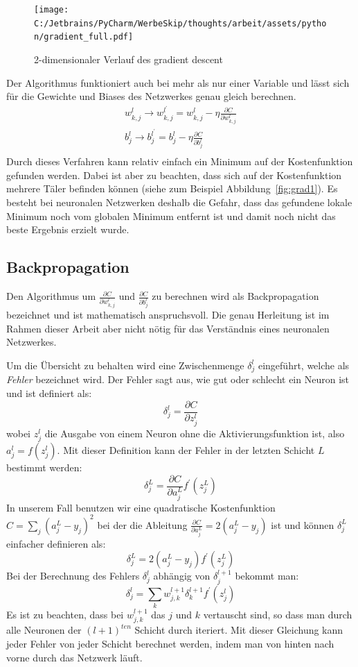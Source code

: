 \documentclass[12pt,a4paper]{report}
\begin{document}
\begin{figure}[!h]%
    \centering
    \texttt{[image: C:/Jetbrains/PyCharm/WerbeSkip/thoughts/arbeit/assets/python/gradient\_full.pdf]} %
    \caption{2-dimensionaler Verlauf des gradient descent}%
    \label{fig:grad2}%
\end{figure}

Der Algorithmus funktioniert auch bei mehr als nur einer Variable und lässt sich für die Gewichte und Biases des Netzwerkes genau gleich berechnen.
\begin{gather*}
    w^l_{k,j} \rightarrow w^{l^\prime}_{k,j} = w^l_{k,j} - \eta\frac{\partial C}{\partial w^l_{k,j}}\\
    b^l_j \rightarrow b^{l^\prime}_j = b^l_j - \eta\frac{\partial C}{\partial b^l_j}\\
\end{gather*}
Durch dieses Verfahren kann relativ einfach ein Minimum auf der Kostenfunktion gefunden werden.
Dabei ist aber zu beachten, dass sich auf der Kostenfunktion mehrere Täler befinden können (siehe zum Beispiel Abbildung~\ref{fig:grad1}).
Es besteht bei neuronalen Netzwerken deshalb die Gefahr, dass das gefundene lokale Minimum noch vom globalen Minimum entfernt ist und
damit noch nicht das beste Ergebnis erzielt wurde.

\subsection{Backpropagation}
Den Algorithmus um $\frac{\partial C}{\partial w^l_{k,j}}$ und $\frac{\partial C}{\partial b^l_j}$ zu berechnen wird als
Backpropagation bezeichnet und ist mathematisch anspruchsvoll.
Die genau Herleitung ist im Rahmen dieser Arbeit aber nicht nötig für das Verständnis eines neuronalen Netzwerkes.

Um die Übersicht zu behalten wird eine Zwischenmenge $\delta^l_j$ eingeführt, welche als \textit{Fehler} bezeichnet wird.
Der Fehler sagt aus, wie gut oder schlecht ein Neuron ist und ist definiert als:
\[\delta^l_j = \frac{\partial C}{\partial z^l_j}\]
wobei $z^l_j$ die Ausgabe von einem Neuron ohne die Aktivierungsfunktion ist, also $a^l_j = f(z^l_j)$.
Mit dieser Definition kann der Fehler in der letzten Schicht $L$ bestimmt werden:
\[\delta^L_j = \frac{\partial C}{\partial a^L_j}f^\prime(z^L_j)\]
In unserem Fall benutzen wir eine quadratische Kostenfunktion $C = \sum_{j}(a^L_j - y_j)^2$ bei
der die Ableitung $\frac{\partial C}{\partial a^L_j} = 2(a^L_j - y_j)$ ist und können $\delta^L_j$ einfacher definieren als:
\[\delta^L_j = 2(a^L_j - y_j)f^\prime(z^L_j)\]
Bei der Berechnung des Fehlers $\delta^l_j$ abhängig von $\delta^{l+1}_j$ bekommt man:
\[\delta^l_j = \sum_k w^{l+1}_{j,k}\delta^{l+1}_k f^\prime(z^l_j)\]
Es ist zu beachten, dass bei $w^{l+1}_{j,k}$ das $j$ und $k$ vertauscht sind, so dass man durch alle Neuronen der $(l+1)^{ten}$ Schicht durch iteriert.
Mit dieser Gleichung kann jeder Fehler von jeder Schicht berechnet werden, indem man von hinten nach vorne durch das Netzwerk läuft.
\end{document}

